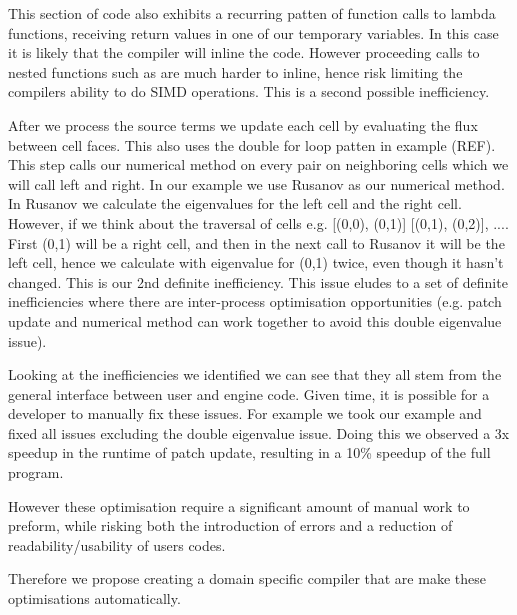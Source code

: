This section of code also exhibits a recurring patten of function calls to lambda functions, receiving return values in one of our temporary variables.
In this case it is likely that the compiler will inline the code.
However proceeding calls to nested functions such as  are much harder to inline, hence risk limiting the compilers ability to do SIMD operations.    
This is a second possible inefficiency.

After we process the source terms we update each cell by evaluating the flux between cell faces.
This also uses the double for loop patten in example (REF). %
This step calls our numerical method on every pair on neighboring cells which we will call left and right.
In our example we use Rusanov as our numerical method.
In Rusanov we calculate the eigenvalues for the left cell and the right cell.
However, if we think about the traversal of cells e.g. [(0,0), (0,1)] [(0,1), (0,2)], .... First (0,1) will be a right cell, and then in the next call to Rusanov it will be the left cell, hence we calculate with eigenvalue for (0,1) twice, even though it hasn't changed.
This is our 2nd definite inefficiency.
This issue eludes to a set of definite inefficiencies where there are inter-process optimisation opportunities (e.g. patch update and numerical method can work together to avoid this double eigenvalue issue).   


Looking at the inefficiencies we identified we can see that they all stem from the general interface between user and engine code.
Given time, it is possible for a developer to manually fix these issues.
For example we took our example and fixed all issues excluding the double eigenvalue issue.
Doing this we observed a 3x speedup in the runtime of patch update, resulting in a 10\% speedup of the full program.

However these optimisation require a significant amount of manual work to preform, while risking both the introduction of errors and a reduction of readability/usability of users codes.

Therefore we propose creating a domain specific compiler that are make these optimisations automatically.


